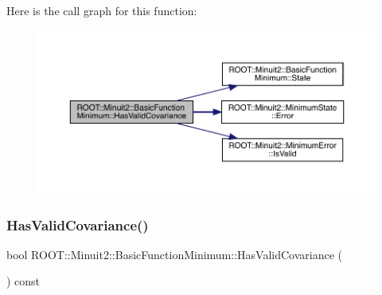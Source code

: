 Here is the call graph for this function\+:
\nopagebreak
\begin{figure}[H]
\begin{center}
\leavevmode
\includegraphics[width=350pt]{de/d25/classROOT_1_1Minuit2_1_1BasicFunctionMinimum_a2bf14deac281ae646e88a2fa6d0b5012_cgraph}
\end{center}
\end{figure}
\mbox{\label{classROOT_1_1Minuit2_1_1BasicFunctionMinimum_a2bf14deac281ae646e88a2fa6d0b5012}} 
\subsubsection{\texorpdfstring{HasValidCovariance()}{HasValidCovariance()}\hspace{0.1cm}{\footnotesize\ttfamily [2/3]}}
{\footnotesize\ttfamily bool R\+O\+O\+T\+::\+Minuit2\+::\+Basic\+Function\+Minimum\+::\+Has\+Valid\+Covariance (\begin{DoxyParamCaption}{ }\end{DoxyParamCaption}) const\hspace{0.3cm}{\ttfamily [inline]}}

